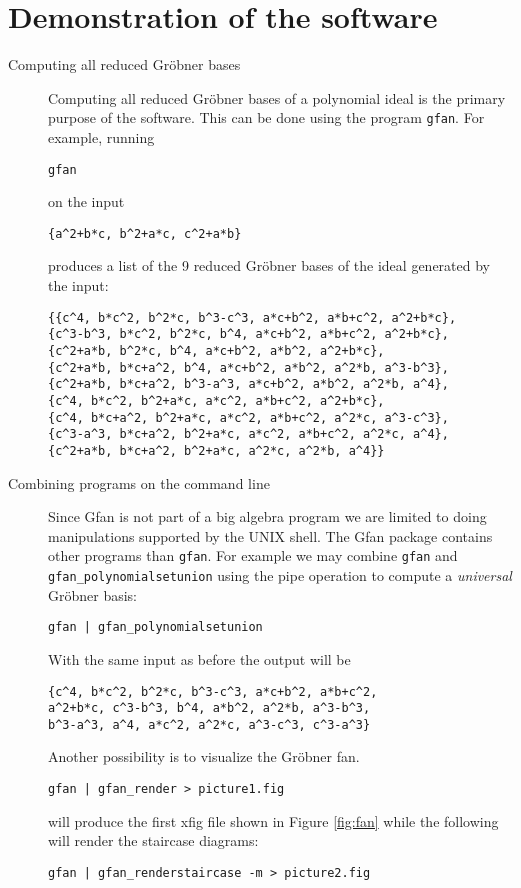 \documentclass[11pt]{article}
\def\name{Gfan }
\begin{document}
\section{Demonstration of the software}
\begin{description}
\item[Computing all re\-duced Gr\"obner bases] \hspace{0.2cm} Computing all reduced Gr\"obner bases of a polynomial ideal is the primary purpose of the software. This can be done using the program {\tt gfan}. For example, running
\begin{verbatim}
gfan
\end{verbatim}
on the input
\begin{verbatim}
{a^2+b*c, b^2+a*c, c^2+a*b}
\end{verbatim}
produces a list of the 9 reduced Gr\"obner bases of the ideal generated by the input:
\begin{verbatim}
{{c^4, b*c^2, b^2*c, b^3-c^3, a*c+b^2, a*b+c^2, a^2+b*c},
{c^3-b^3, b*c^2, b^2*c, b^4, a*c+b^2, a*b+c^2, a^2+b*c},
{c^2+a*b, b^2*c, b^4, a*c+b^2, a*b^2, a^2+b*c},
{c^2+a*b, b*c+a^2, b^4, a*c+b^2, a*b^2, a^2*b, a^3-b^3},
{c^2+a*b, b*c+a^2, b^3-a^3, a*c+b^2, a*b^2, a^2*b, a^4},
{c^4, b*c^2, b^2+a*c, a*c^2, a*b+c^2, a^2+b*c},
{c^4, b*c+a^2, b^2+a*c, a*c^2, a*b+c^2, a^2*c, a^3-c^3},
{c^3-a^3, b*c+a^2, b^2+a*c, a*c^2, a*b+c^2, a^2*c, a^4},
{c^2+a*b, b*c+a^2, b^2+a*c, a^2*c, a^2*b, a^4}}
\end{verbatim}
\item[Combining programs on the command line]
Since \name is not part of a big algebra program we are limited to doing manipulations supported by the UNIX shell. The \name package contains other programs than {\tt gfan}. For example we may combine {\tt gfan} and {\tt gfan\_polynomialsetunion} using the pipe operation to compute a \emph{universal} Gr\"obner basis:
\begin{verbatim}
gfan | gfan_polynomialsetunion
\end{verbatim}
With the same input as before the output will be
\begin{verbatim}
{c^4, b*c^2, b^2*c, b^3-c^3, a*c+b^2, a*b+c^2,
a^2+b*c, c^3-b^3, b^4, a*b^2, a^2*b, a^3-b^3,
b^3-a^3, a^4, a*c^2, a^2*c, a^3-c^3, c^3-a^3}
\end{verbatim}
Another possibility is to visualize the Gr\"obner fan.
\begin{verbatim}
gfan | gfan_render > picture1.fig
\end{verbatim}
will produce the first xfig file shown in Figure \ref{fig:fan} while the following will render the staircase diagrams:
\begin{verbatim}
gfan | gfan_renderstaircase -m > picture2.fig
\end{verbatim}


\end{description}
\end{document}
